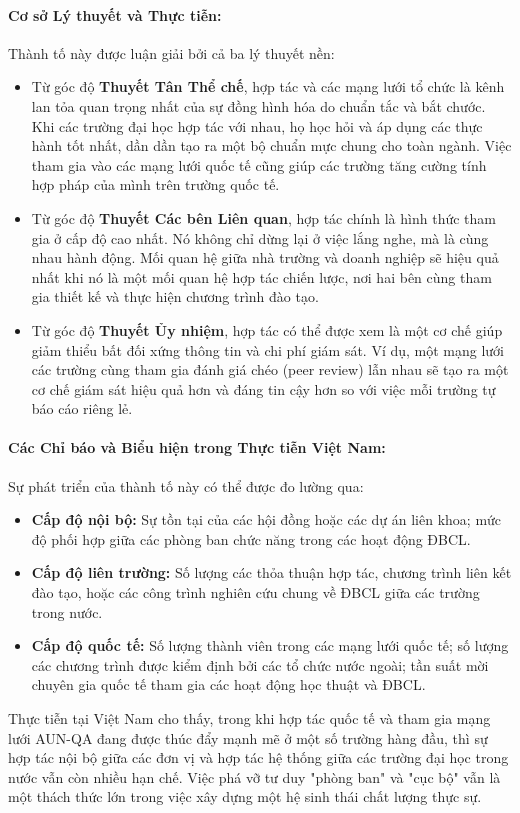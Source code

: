 \documentclass[12pt, a4paper, openany]{report}
\begin{document}
\paragraph{Cơ sở Lý thuyết và Thực tiễn:}
Thành tố này được luận giải bởi cả ba lý thuyết nền:
\begin{itemize}
    \item Từ góc độ \textbf{Thuyết Tân Thể chế}, hợp tác và các mạng lưới tổ chức là kênh lan tỏa quan trọng nhất của sự đồng hình hóa do chuẩn tắc và bắt chước. Khi các trường đại học hợp tác với nhau, họ học hỏi và áp dụng các thực hành tốt nhất, dần dần tạo ra một bộ chuẩn mực chung cho toàn ngành. Việc tham gia vào các mạng lưới quốc tế cũng giúp các trường tăng cường tính hợp pháp của mình trên trường quốc tế.
    \item Từ góc độ \textbf{Thuyết Các bên Liên quan}, hợp tác chính là hình thức tham gia ở cấp độ cao nhất. Nó không chỉ dừng lại ở việc lắng nghe, mà là cùng nhau hành động. Mối quan hệ giữa nhà trường và doanh nghiệp sẽ hiệu quả nhất khi nó là một mối quan hệ hợp tác chiến lược, nơi hai bên cùng tham gia thiết kế và thực hiện chương trình đào tạo.
    \item Từ góc độ \textbf{Thuyết Ủy nhiệm}, hợp tác có thể được xem là một cơ chế giúp giảm thiểu bất đối xứng thông tin và chi phí giám sát. Ví dụ, một mạng lưới các trường cùng tham gia đánh giá chéo (peer review) lẫn nhau sẽ tạo ra một cơ chế giám sát hiệu quả hơn và đáng tin cậy hơn so với việc mỗi trường tự báo cáo riêng lẻ.
\end{itemize}

\paragraph{Các Chỉ báo và Biểu hiện trong Thực tiễn Việt Nam:}
Sự phát triển của thành tố này có thể được đo lường qua:
\begin{itemize}
    \item \textbf{Cấp độ nội bộ:} Sự tồn tại của các hội đồng hoặc các dự án liên khoa; mức độ phối hợp giữa các phòng ban chức năng trong các hoạt động ĐBCL.
    \item \textbf{Cấp độ liên trường:} Số lượng các thỏa thuận hợp tác, chương trình liên kết đào tạo, hoặc các công trình nghiên cứu chung về ĐBCL giữa các trường trong nước.
    \item \textbf{Cấp độ quốc tế:} Số lượng thành viên trong các mạng lưới quốc tế; số lượng các chương trình được kiểm định bởi các tổ chức nước ngoài; tần suất mời chuyên gia quốc tế tham gia các hoạt động học thuật và ĐBCL.
\end{itemize}
Thực tiễn tại Việt Nam cho thấy, trong khi hợp tác quốc tế và tham gia mạng lưới AUN-QA đang được thúc đẩy mạnh mẽ ở một số trường hàng đầu, thì sự hợp tác nội bộ giữa các đơn vị và hợp tác hệ thống giữa các trường đại học trong nước vẫn còn nhiều hạn chế. Việc phá vỡ tư duy "phòng ban" và "cục bộ" vẫn là một thách thức lớn trong việc xây dựng một hệ sinh thái chất lượng thực sự.
\end{document}
